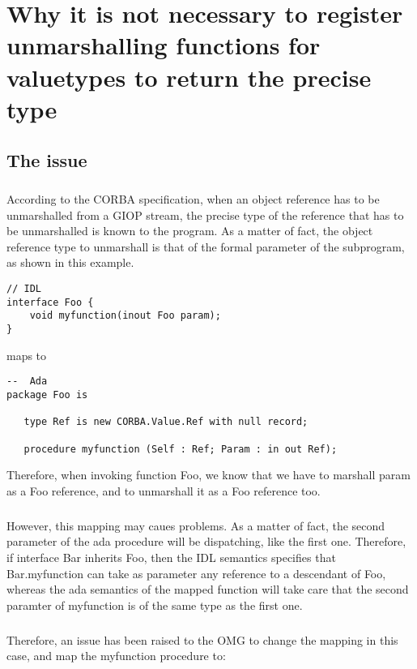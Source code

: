 \chapter{Why it is not necessary to register unmarshalling functions
for valuetypes to return the precise type}

\section{The issue}

\paragraph{} According to the CORBA specification, when an object
reference has to be unmarshalled from a GIOP stream, the precise type
of the reference that has to be unmarshalled is known to the
program. As a matter of fact, the object reference type to unmarshall
is that of the formal parameter of the subprogram, as shown in this
example.

\begin{verbatim}
// IDL
interface Foo {
    void myfunction(inout Foo param);
}
\end{verbatim}

maps to

\begin{verbatim}
--  Ada
package Foo is

   type Ref is new CORBA.Value.Ref with null record;

   procedure myfunction (Self : Ref; Param : in out Ref);
\end{verbatim}

Therefore, when invoking function Foo, we know that we have to
marshall param as a Foo reference, and to unmarshall it as a Foo
reference too.

\paragraph{}However, this mapping may caues problems. As a matter of
fact, the second parameter of the ada procedure will be dispatching,
like the first one. Therefore, if interface Bar inherits Foo, then the
IDL semantics specifies that Bar.myfunction can take as parameter any
reference to a descendant of Foo, whereas the ada semantics of the
mapped function will take care that the second paramter of myfunction
is of the same type as the first one.

\paragraph{}Therefore, an issue has been raised to the OMG to change
the mapping in this case, and map the myfunction procedure to:

